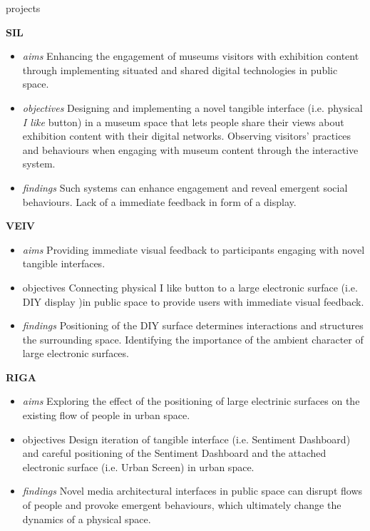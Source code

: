 
\begin{singlespace}{

\begin{labeling}{projects}

\item [\textbf{SIL}] 
\begin {itemize} 
\footnotesize
\item [\textit{aims}] Enhancing the engagement of museums visitors with exhibition content through implementing situated and shared digital technologies in public space. 
\item [\textit{objectives}] Designing and implementing a novel tangible interface (i.e. physical \textit{I like} button) in a museum space that lets people share their views about exhibition content with their digital networks. \newline Observing visitors' practices and behaviours when engaging with museum content through the interactive system. 
\item [\textit{findings}] Such systems can enhance engagement and reveal emergent social behaviours. \newline Lack of a immediate feedback in form of a display.

\end{itemize}

\item [\textbf{VEIV}] 
\begin {itemize}
\footnotesize
\item [\textit{aims}] Providing immediate visual feedback to participants engaging with novel tangible interfaces.
\item [{objectives}] Connecting physical {I like} button to a large electronic surface (i.e. {DIY display} )in public space to provide users with immediate visual feedback.
\item [\textit{findings}]  Positioning of the DIY surface determines interactions and structures the surrounding space. \newline Identifying the importance of the ambient character of large electronic surfaces.
\end{itemize}

\item [\textbf{RIGA}] 
\begin {itemize}
\footnotesize
\item [\textit{aims}] Exploring the effect of the positioning of large electrinic surfaces on the existing flow of people in urban space.
\item [{objectives}] Design iteration of tangible interface (i.e. {Sentiment Dashboard}) and careful positioning of the {Sentiment Dashboard} and the attached electronic surface (i.e. {Urban Screen}) in urban space.
\item [\textit{findings}] Novel media architectural interfaces in public space can disrupt flows of people and provoke emergent behaviours, which ultimately change the dynamics of a physical space.
\end{itemize}


\end{labeling}}
\end{singlespace}
